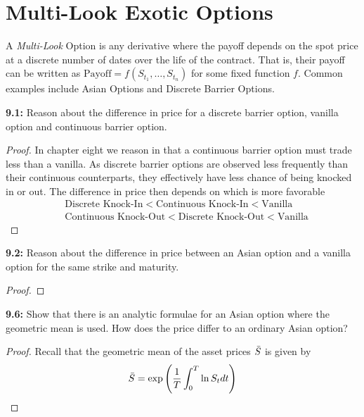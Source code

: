 \newpage
\section{Multi-Look Exotic Options}
A \textit{Multi-Look} Option is any derivative where the payoff depends on the spot price at a discrete number of dates over the life of the contract. That is, their payoff can be written as $\text{Payoff} = f\left(S_{t_1},\dots,S_{t_n}\right)$ for some fixed function $f$. Common examples include Asian Options and Discrete Barrier Options. 

\begin{tcolorbox}[colframe=black,colback=gray!5,boxrule=0.5pt]
\textbf{9.1:} Reason about the difference in price for a discrete barrier option, vanilla option and continuous barrier option. 
\end{tcolorbox}
\begin{proof}
    In chapter eight we reason in that a continuous barrier option must trade less than a vanilla. As discrete barrier options are observed less frequently than their continuous counterparts, they effectively have less chance of being knocked in or out. The difference in price then depends on which is more favorable
    \begin{align*}
        & \text{Discrete Knock-In} < \text{Continuous Knock-In} < \text{Vanilla} \\
        & \text{Continuous Knock-Out} < \text{Discrete Knock-Out} < \text{Vanilla}
    \end{align*}
\end{proof}


\begin{tcolorbox}[colframe=black,colback=gray!5,boxrule=0.5pt]
\textbf{9.2:} Reason about the difference in price between an Asian option and a vanilla option for the same strike and maturity.
\end{tcolorbox}
\begin{proof}
    
\end{proof}


\begin{tcolorbox}[colframe=black,colback=gray!5,boxrule=0.5pt]
\textbf{9.6:} Show that there is an analytic formulae for an Asian option where the geometric mean is used. How does the price differ to an ordinary Asian option?  
\end{tcolorbox}
\begin{proof}
    Recall that the geometric mean of the asset prices $\Bar{S}$ is given by 
    $$\Bar{S} = \exp\left(\frac{1}{T}\int_0^T\ln S_t dt\right)$$
\end{proof}